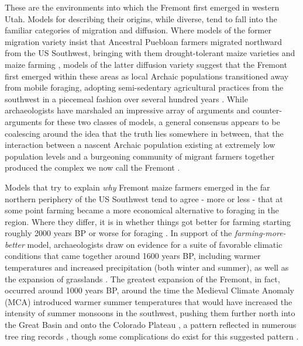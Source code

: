 \documentclass[
  number,
  preprint,
  3p]{elsarticle}
\begin{document}
These are the environments into which the Fremont first emerged in
western Utah. Models for describing their origins, while diverse, tend
to fall into the familiar categories of migration and diffusion. Where
models of the former migration variety insist that Ancestral Puebloan
farmers migrated northward from the US Southwest, bringing with them
drought-tolerant maize varieties and maize farming
\citep{madsen1975, kidder1924}, models of the latter diffusion variety
suggest that the Fremont first emerged within these areas as local
Archaic populations transitioned away from mobile foraging, adopting
semi-sedentary agricultural practices from the southwest in a piecemeal
fashion over several hundred years \citep{jennings1978, winter1974}.
While archaeologists have marshaled an impressive array of arguments and
counter-arguments for these two classes of models, a general consensus
appears to be coalescing around the idea that the truth lies somewhere
in between, that the interaction between a nascent Archaic population
existing at extremely low population levels and a burgeoning community
of migrant farmers together produced the complex we now call the Fremont
\citep{patterson2015, simms1986, spangler1993, spangler2000, spangler2013}.

Models that try to explain \emph{why} Fremont maize farmers emerged in
the far northern periphery of the US Southwest tend to agree - more or
less - that at some point farming became a more economical alternative
to foraging in the region. Where they differ, it is in whether things
got better for farming starting roughly 2000 years BP
\citep{benson2011, coltrain2002, matson1988} or worse for foraging
\citep{barlow2002, broughton2010, cannon2000, cannon2001}. In support of
the \emph{farming-more-better} model, archaeologists draw on evidence
for a suite of favorable climatic conditions that came together around
1600 years BP, including warmer temperatures and increased precipitation
(both winter and summer), as well as the expansion of grasslands
\citep{grayson2006, hemphill1995, rhode2000}. The greatest expansion of
the Fremont, in fact, occurred around 1000 years BP, around the time the
Medieval Climate Anomaly (MCA) introduced warmer summer temperatures
that would have increased the intensity of summer monsoons in the
southwest, pushing them further north into the Great Basin and onto the
Colorado Plateau \citep{grayson2006}, a pattern reflected in numerous
tree ring records
\citep[e.g.,][]{graybill1990, leavitt1994, stine1990, salzer2014},
though some complications do exist for this suggested pattern
\citep{hart2021}.
\end{document}
